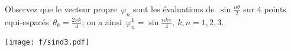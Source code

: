 Observez que le vecteur propre~$\varphi_n$ sont les évaluations
de~$\sin\tfrac{n\theta}2$
sur 4 points equi-espacés~$\theta_k=\tfrac{2\pi k}{4}$; on a
ainsi~$\varphi_n^k=\sin\frac{nk\pi}4,\ k,\!n=1,2,3$.

\begin{center}
\texttt{[image: f/sind3.pdf]}
\end{center}

\clearpage


